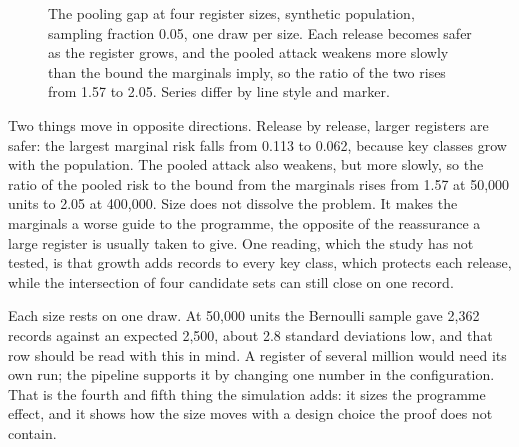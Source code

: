 \begin{figure}[ht]
\centering
{}
\caption{The pooling gap at four register sizes, synthetic population, sampling
fraction 0.05, one draw per size. Each release becomes safer as the register grows,
and the pooled attack weakens more slowly than the bound the marginals imply, so the
ratio of the two rises from 1.57 to 2.05. Series differ by line style and marker.}
\label{c11:fig-scaling}
\end{figure}

Two things move in opposite directions. Release by release, larger registers are
safer: the largest marginal risk falls from 0.113 to 0.062, because key classes grow
with the population. The pooled attack also weakens, but more slowly, so the ratio of
the pooled risk to the bound from the marginals rises from 1.57 at 50,000 units to
2.05 at 400,000.
Size does not dissolve the problem. It makes the marginals a worse guide to the
programme, the opposite of the reassurance a large register is usually taken to give.
One reading, which the study has not tested, is that growth adds records to every key
class, which protects each release, while the intersection of four candidate sets can
still close on one record.

Each size rests on one draw. At 50,000 units the Bernoulli sample gave 2,362 records
against an expected 2,500, about 2.8 standard deviations low, and that row should be
read with this in mind.
A register of several million would need its own run; the pipeline supports it by
changing one number in the configuration. That is the fourth and fifth thing the
simulation adds: it sizes the programme effect, and it shows how the size moves with
a design choice the proof does not contain.


